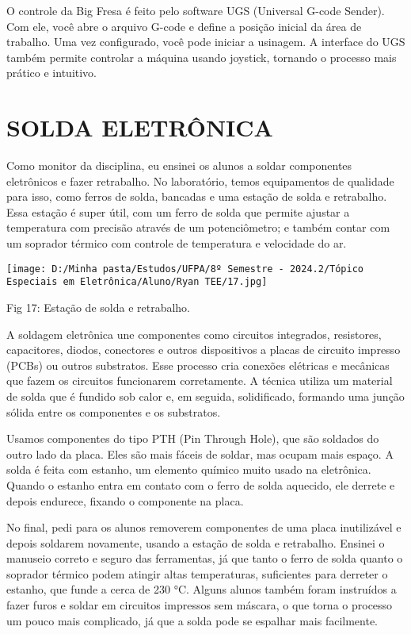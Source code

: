 \documentclass[
]{book}
\begin{document}
O controle da Big Fresa é feito pelo software UGS (Universal G-code Sender). Com ele, você abre o arquivo G-code e define a posição inicial da área de trabalho. Uma vez configurado, você pode iniciar a usinagem. A interface do UGS também permite controlar a máquina usando joystick, tornando o processo mais prático e intuitivo.

\chapter{SOLDA ELETRÔNICA}\label{solda-eletruxf4nica}

Como monitor da disciplina, eu ensinei os alunos a soldar componentes eletrônicos e fazer retrabalho. No laboratório, temos equipamentos de qualidade para isso, como ferros de solda, bancadas e uma estação de solda e retrabalho. Essa estação é super útil, com um ferro de solda que permite ajustar a temperatura com precisão através de um potenciômetro; e também contar com um soprador térmico com controle de temperatura e velocidade do ar.

\texttt{[image: D:/Minha pasta/Estudos/UFPA/8º Semestre - 2024.2/Tópico Especiais em Eletrônica/Aluno/Ryan TEE/17.jpg]}

Fig 17: Estação de solda e retrabalho.

A soldagem eletrônica une componentes como circuitos integrados, resistores, capacitores, diodos, conectores e outros dispositivos a placas de circuito impresso (PCBs) ou outros substratos. Esse processo cria conexões elétricas e mecânicas que fazem os circuitos funcionarem corretamente. A técnica utiliza um material de solda que é fundido sob calor e, em seguida, solidificado, formando uma junção sólida entre os componentes e os substratos.

Usamos componentes do tipo PTH (Pin Through Hole), que são soldados do outro lado da placa. Eles são mais fáceis de soldar, mas ocupam mais espaço. A solda é feita com estanho, um elemento químico muito usado na eletrônica. Quando o estanho entra em contato com o ferro de solda aquecido, ele derrete e depois endurece, fixando o componente na placa.

No final, pedi para os alunos removerem componentes de uma placa inutilizável e depois soldarem novamente, usando a estação de solda e retrabalho. Ensinei o manuseio correto e seguro das ferramentas, já que tanto o ferro de solda quanto o soprador térmico podem atingir altas temperaturas, suficientes para derreter o estanho, que funde a cerca de 230 °C. Alguns alunos também foram instruídos a fazer furos e soldar em circuitos impressos sem máscara, o que torna o processo um pouco mais complicado, já que a solda pode se espalhar mais facilmente.
\end{document}
